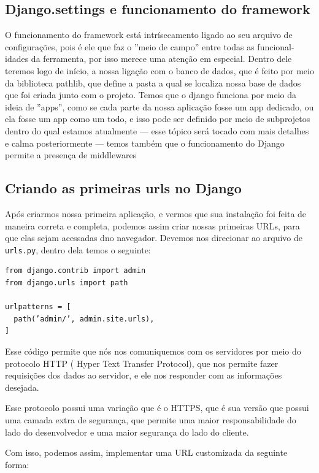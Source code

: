\documentclass[12pt, a4paper]{paper}
\begin{document}
\subsection{Django.settings e funcionamento do framework} %
\label{sub:Django.settings e funcionamento do framework}
O funcionamento do framework está intrísecamento ligado ao seu arquivo de
configurações, pois é ele que faz o ”meio de campo” entre todas as funcional-
idades da ferramenta, por isso merece uma atenção em especial. Dentro dele
teremos logo de início, a nossa ligação com o banco de dados, que é feito por
meio da biblioteca pathlib, que define a pasta a qual se localiza nossa base
de dados que foi criada junto com o projeto.
Temos que o django funciona por meio da ideia de ”apps”, como se cada
parte da nossa aplicação fosse um app dedicado, ou ela fosse um app como
um todo, e isso pode ser definido por meio de subprojetos dentro do qual
estamos atualmente — esse tópico será tocado com mais detalhes e calma
posteriormente — temos também que o funcionamento do Django permite a
presença de middlewares 

\subsection{Criando as primeiras urls no Django} %
\label{sub:Criando as primeiras urls no Django}
Após criarmos nossa primeira aplicação, e vermos que sua instalação foi feita
de maneira correta e completa, podemos assim criar nossas primeiras URLs,
para que elas sejam acessadas dno navegador. Devemos nos direcionar ao
arquivo de \texttt{urls.py}, dentro dela temos o seguinte:

\begin{verbatim}
from django.contrib import admin
from django.urls import path
  
urlpatterns = [
  path(’admin/’, admin.site.urls),
]
\end{verbatim}

Esse código permite que nós nos comuniquemos com os servidores por meio do 
protocolo HTTP ( Hyper Text Transfer Protocol), que nos permite fazer requisições
dos dados ao servidor, e ele nos responder com as informações desejada.
  
Esse protocolo possui uma variação que é o HTTPS, que é sua versão que possui uma 
camada extra de segurança, que permite uma maior responsabilidade do lado do 
desenvolvedor e uma maior segurança do lado do cliente. 

Com isso, podemos assim, implementar uma URL customizada da seguinte forma:
\end{document}
